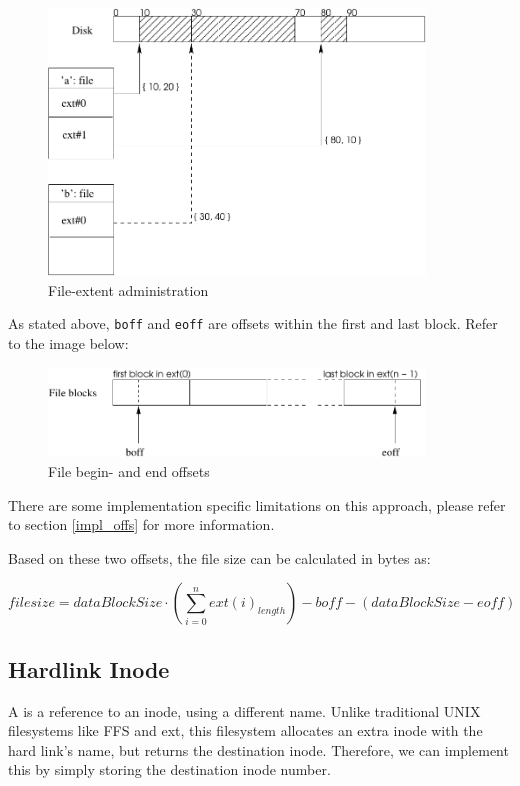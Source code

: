 \begin{figure}[h]
\includegraphics[width=10cm]{file-extent}
\caption{File-extent administration}
\end{figure}

\label{offs}As stated above, \texttt{boff} and \texttt{eoff} are offsets within the first and last block. Refer to the image below:

\begin{figure}[h]
\includegraphics[width=10cm]{file-offs}
\caption{File begin- and end offsets}
\end{figure}

There are some implementation specific limitations on this approach, please refer to section \ref{impl_offs} for more information.

Based on these two offsets, the file size can be calculated in bytes as:

\begin{displaymath}
filesize = dataBlockSize \cdot \left( \sum_{i=0}^{n} ext(i)_{length} \right) - boff - \left( dataBlockSize - eoff \right)
\end{displaymath}

\subsection{Hardlink Inode}
\label{hardlink}

A  is a reference to an inode, using a different name. Unlike traditional UNIX filesystems like FFS and ext, this filesystem allocates an extra inode with the hard link's name, but returns the destination inode. Therefore, we can implement this by simply storing the destination inode number.

